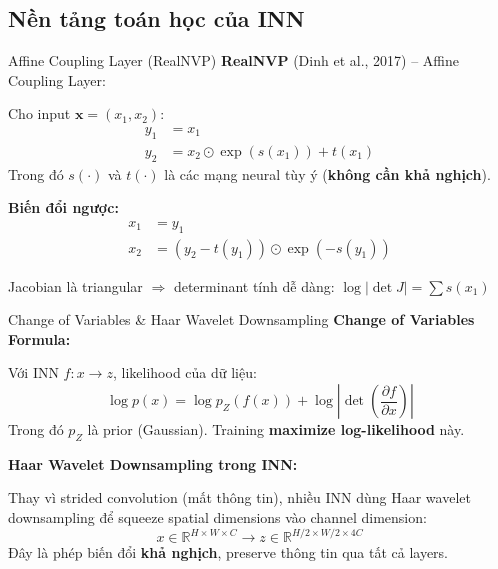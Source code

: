 \documentclass{beamer}
\begin{document}
\subsection{Nền tảng toán học của INN}

\begin{frame}{Affine Coupling Layer (RealNVP)}
    \textbf{RealNVP} (Dinh et al., 2017) -- Affine Coupling Layer:

    \vspace{0.2cm}
    Cho input $\mathbf{x} = (x_1, x_2)$:
    \begin{align}
        y_1 &= x_1 \nonumber \\
        y_2 &= x_2 \odot \exp(s(x_1)) + t(x_1)
    \end{align}
    Trong đó $s(\cdot)$ và $t(\cdot)$ là các mạng neural tùy ý (\textbf{không cần khả nghịch}).

    \vspace{0.2cm}
    \textbf{Biến đổi ngược:}
    \begin{align}
        x_1 &= y_1 \nonumber \\
        x_2 &= (y_2 - t(y_1)) \odot \exp(-s(y_1))
    \end{align}

    \vspace{0.2cm}
    Jacobian là triangular $\Rightarrow$ determinant tính dễ dàng: $\log|{\det J}| = \sum s(x_1)$
\end{frame}

\begin{frame}{Change of Variables \& Haar Wavelet Downsampling}
    \textbf{Change of Variables Formula:}

    Với INN $f: x \to z$, likelihood của dữ liệu:
    \begin{equation}
        \log p(x) = \log p_Z(f(x)) + \log \left|\det\!\left(\frac{\partial f}{\partial x}\right)\right|
    \end{equation}
    Trong đó $p_Z$ là prior (Gaussian). Training \textbf{maximize log-likelihood} này.

    \vspace{0.3cm}
    \textbf{Haar Wavelet Downsampling trong INN:}

    Thay vì strided convolution (mất thông tin), nhiều INN dùng Haar wavelet downsampling để squeeze spatial dimensions vào channel dimension:
    \begin{equation}
        x \in \mathbb{R}^{H \times W \times C} \to z \in \mathbb{R}^{H/2 \times W/2 \times 4C}
    \end{equation}
    Đây là phép biến đổi \textbf{khả nghịch}, preserve thông tin qua tất cả layers.
\end{frame}
\end{document}
